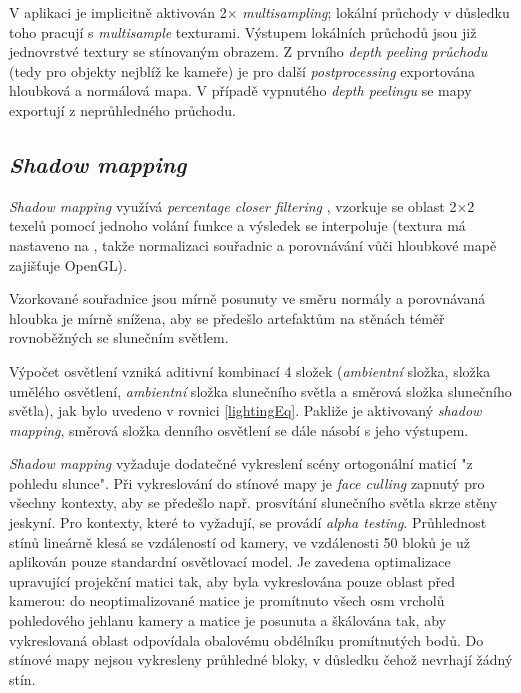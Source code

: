 V aplikaci je implicitně aktivován 2× \textit{multisampling}; lokální průchody v důsledku toho pracují s \textit{multisample} texturami. Výstupem lokálních průchodů jsou již jednovrstvé textury se stínovaným obrazem. Z prvního \textit{depth peeling průchodu} (tedy pro objekty nejblíž ke kameře) je pro další \textit{postprocessing} exportována hloubková a normálová mapa. V případě vypnutého \textit{depth peelingu} se mapy exportují z neprůhledného průchodu.

\pagebreak
\subsection{\textit{Shadow mapping}}
\textit{Shadow mapping} využívá \textit{percentage closer filtering} \cite{ReevesWilliamT.1987Rasw}, vzorkuje se oblast 2×2 texelů pomocí jednoho volání funkce  a výsledek se interpoluje (textura má nastaveno  na , takže normalizaci souřadnic a porovnávání vůči hloubkové mapě zajišťuje OpenGL).


Vzorkované souřadnice jsou mírně posunuty ve směru normály a porovnávaná hloubka je mírně snížena, aby se předešlo artefaktům na stěnách téměř rovnoběžných se slunečním světlem.


Výpočet osvětlení vzniká aditivní kombinací 4 složek (\textit{ambientní} složka, složka umělého osvětlení, \textit{ambientní} složka slunečního světla a směrová složka slunečního světla), jak bylo uvedeno v rovnici \ref{lightingEq}. Pakliže je aktivovaný \textit{shadow mapping}, směrová složka denního osvětlení se dále násobí s jeho výstupem.

\textit{Shadow mapping} vyžaduje dodatečné vykreslení scény ortogonální maticí "z pohledu slunce". Při vykreslování do stínové mapy je \textit{face culling} zapnutý pro všechny kontexty, aby se předešlo např. prosvítání slunečního světla skrze stěny jeskyní. Pro kontexty, které to vyžadují, se provádí \textit{alpha testing}. Průhlednost stínů lineárně klesá se vzdáleností od kamery, ve vzdálenosti 50 bloků je už aplikován pouze standardní osvětlovací model. Je zavedena optimalizace upravující projekční matici tak, aby byla vykreslována pouze oblast před kamerou: do neoptimalizované matice je promítnuto všech osm vrcholů pohledového jehlanu kamery a matice je posunuta a škálována tak, aby vykreslovaná oblast odpovídala obalovému obdélníku promítnutých bodů. Do stínové mapy nejsou vykresleny průhledné bloky, v důsledku čehož nevrhají žádný stín.

